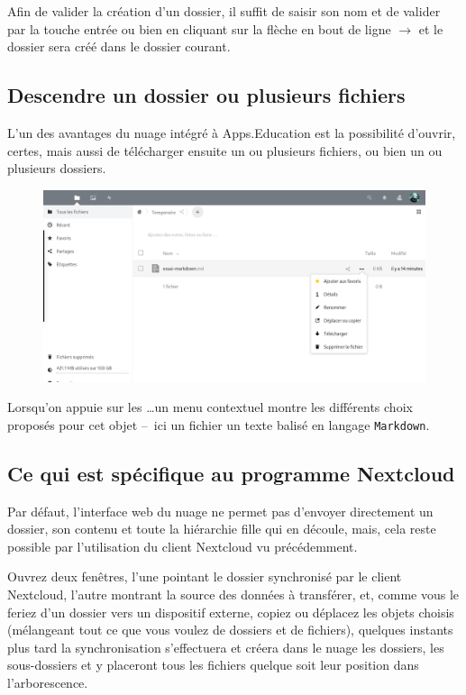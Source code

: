 Afin de valider la création d'un dossier, il suffit de saisir son nom et de valider par la touche entrée ou bien en cliquant sur la flèche en bout de ligne $\rightarrow$ et le dossier sera créé dans le dossier courant.

\subsection{Descendre un dossier ou plusieurs fichiers}
L'un des avantages du nuage intégré à Apps.Education est la possibilité d'ouvrir, certes, mais aussi de télécharger ensuite un ou plusieurs fichiers, ou bien un ou plusieurs dossiers.

\begin{figure}
	\centering
	\includegraphics{./Captures/nuage.accueil.menu.contextuel.png}
	\caption{}
\end{figure}
Lorsqu'on appuie sur les \ldots un menu contextuel montre les différents choix proposés pour cet objet --~ici un fichier un texte balisé en langage \texttt{Markdown}. 

\subsection{Ce qui est spécifique au programme Nextcloud}
Par défaut, l'interface web du nuage ne permet pas d'envoyer directement un dossier, son contenu et toute la hiérarchie fille qui en découle, mais, cela reste possible par l'utilisation du client Nextcloud vu précédemment. 

Ouvrez deux fenêtres, l'une pointant le dossier synchronisé par le client Nextcloud, l'autre montrant la source des données à transférer, et, comme vous le feriez d'un dossier vers un dispositif externe, copiez ou déplacez les objets choisis (mélangeant tout ce que vous voulez de dossiers et de fichiers), quelques instants plus tard la synchronisation s'effectuera et créera dans le nuage les dossiers, les sous-dossiers et y placeront tous les fichiers quelque soit leur position dans l'arborescence.

